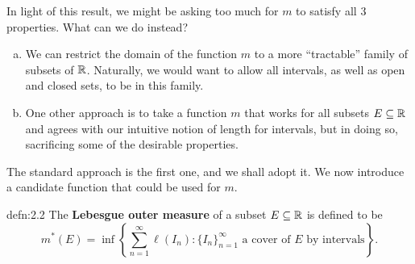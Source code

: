 In light of this result, we might be asking too much for $m$ 
to satisfy all $3$ properties. What can we do instead? 
\begin{enumerate}[(a)]
    \item We can restrict the domain of the function $m$ to a 
    more ``tractable'' family of subsets of $\mathbb{R}$. Naturally, we would want to 
    allow all intervals, as well as open and closed sets, to be in this family.
    \item One other approach is to take a function $m$ that works for all 
    subsets $E \subseteq \mathbb{R}$ and agrees with our intuitive notion of length 
    for intervals, but in doing so, sacrificing some of the desirable properties. 
\end{enumerate}

The standard approach is the first one, and we shall adopt it. We now 
introduce a candidate function that could be used for $m$. 

\begin{defn}{defn:2.2}
    The {\bf Lebesgue outer measure} of a subset $E \subseteq \mathbb{R}$ is defined to be 
    \[ m^*(E) = \inf\left\{ \sum_{n=1}^\infty \ell(I_n) : \{I_n\}_{n=1}^\infty 
    \text{ a cover of $E$ by intervals}\right\}. \] 
\end{defn}
